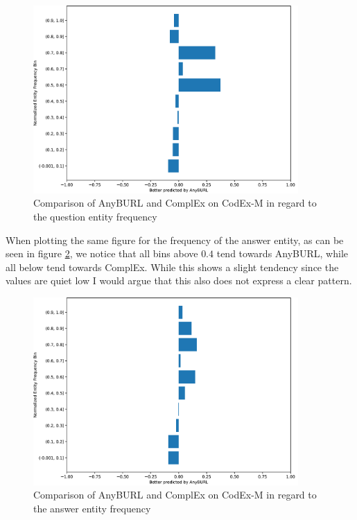 \begin{figure}[H]
\centering
\includegraphics[width=0.9\textwidth]{images/entity_freq_question_anyburl_complex_codex.PNG}
\caption{Comparison of AnyBURL and ComplEx on CodEx-M in regard to the question entity frequency}
\label{fig:entity_question_tail_anyburl_complex_codex}
\end{figure}

When plotting the same figure for the frequency of the answer entity, as can be seen in figure \ref{fig:entity_answer_tail_anyburl_complex_codex}, we notice that all bins above $0.4$ tend towards AnyBURL, while all below tend towards ComplEx. While this shows a slight tendency since the values are quiet low I would argue that this also does not express a clear pattern. 

\begin{figure}[H]
\centering
\includegraphics[width=0.9\textwidth]{images/entity_freq_answer_anyburl_complex_codex.PNG}
\caption{Comparison of AnyBURL and ComplEx on CodEx-M in regard to the answer entity frequency}
\label{fig:entity_answer_tail_anyburl_complex_codex}
\end{figure}

